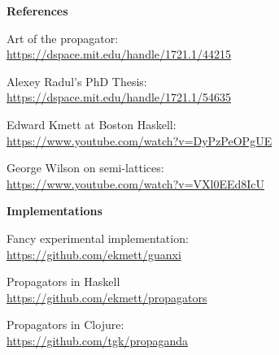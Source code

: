 \documentclass[UKenglish,usenames,dvipsnames,svgnames,table,aspectratio=169,mathserif]{beamer}
\newcommand{\nl}{\vspace{\baselineskip}}
\begin{document}
\begin{frame}

{\Large \bf
References}

Art of the propagator: \\
\url{https://dspace.mit.edu/handle/1721.1/44215}

Alexey Radul's PhD Thesis: \\
\url{https://dspace.mit.edu/handle/1721.1/54635}

Edward Kmett at Boston Haskell: \\
\url{https://www.youtube.com/watch?v=DyPzPeOPgUE}

George Wilson on semi-lattices: \\
\url{https://www.youtube.com/watch?v=VXl0EEd8IcU}

\nl
{\Large \bf
Implementations}

Fancy experimental implementation: \\
\url{https://github.com/ekmett/guanxi}

Propagators in Haskell \\
\url{https://github.com/ekmett/propagators}

Propagators in Clojure: \\
\url{https://github.com/tgk/propaganda}

\end{frame}
\end{document}
